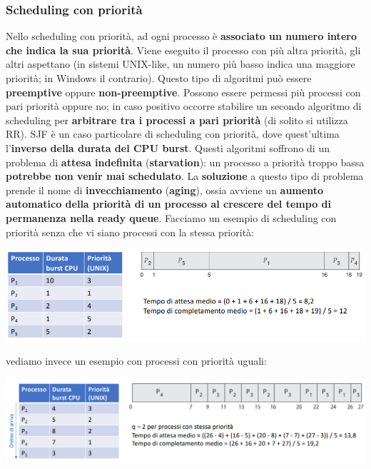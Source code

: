 \documentclass[12pt]{article}
\begin{document}
\subsubsection{Scheduling con priorità}
Nello scheduling con priorità, ad ogni processo è \textbf{associato un numero intero che indica la sua priorità}.
Viene eseguito il processo con più altra priorità, gli altri aspettano (in sistemi UNIX-like, un numero più basso indica una maggiore priorità; in Windows il contrario).
Questo tipo di algoritmi può essere \textbf{preemptive} oppure \textbf{non-preemptive}.
Possono essere permessi più processi con pari priorità oppure no; in caso positivo occorre stabilire un secondo algoritmo di scheduling per \textbf{arbitrare tra i processi a pari priorità} (di solito si utilizza RR).
SJF è un caso particolare di scheduling con priorità, dove quest'ultima l'\textbf{inverso della durata del CPU burst}.
Questi algoritmi soffrono di un problema di \textbf{attesa indefinita} (\textbf{starvation}): un processo a priorità troppo bassa \textbf{potrebbe non venir mai schedulato}.
La \textbf{soluzione} a questo tipo di problema prende il nome di \textbf{invecchiamento} (\textbf{aging}), ossia avviene un \textbf{aumento automatico della priorità di un processo al crescere del tempo di permanenza nella ready queue}.
Facciamo un esempio di scheduling con priorità senza che vi siano processi con la stessa priorità:
\begin{center}
    \includegraphics[width = 0.90\linewidth]{Images/49.png}
\end{center}
vediamo invece un esempio con processi con priorità uguali:
\begin{center}
    \includegraphics[width = 0.90\linewidth]{Images/50.png}
\end{center}
\end{document}
